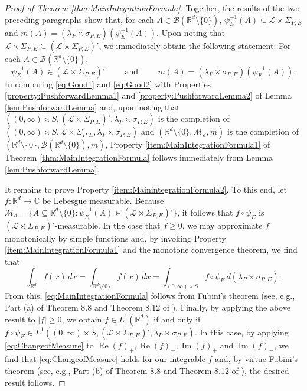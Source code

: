 \documentclass[11pt]{article}
\theoremstyle{remark}
\renewcommand\Re{\operatorname{Re}}%
\renewcommand\Im{\operatorname{Im}}
\begin{document}
\begin{proof}[Proof of Theorem \ref{thm:MainIntegrationFormula}]
Together, the results of the two preceding paragraphs show that, for each $A\in\mathcal{B}(\mathbb{R}^d\setminus\{0\})$, $\psi_E^{-1}(A)\subseteq \mathcal{L}\times\Sigma_{P,E}$ and $m(A)=(\lambda_P\times\sigma_{P,E})(\psi_E^{-1}(A))$. Upon noting that $\mathcal{L}\times\Sigma_{P,E}\subseteq (\mathcal{L}\times\Sigma_{P,E})'$, we immediately obtain the following statement: For each $A\in\mathcal{B}(\mathbb{R}^d\setminus\{0\})$,
\begin{equation}\label{eq:Good2}
\psi_E^{-1}(A)\in (\mathcal{L}\times\Sigma_{P,E})'\hspace{1cm}\mbox{and}\hspace{1cm}m(A)=(\lambda_P\times\sigma_{P,E})(\psi_E^{-1}(A)).
\end{equation}
In comparing \eqref{eq:Good1} and \eqref{eq:Good2} with Properties \ref{property:PushforwardLemma1} and \ref{property:PushforwardLemma2} of Lemma \ref{lem:PushforwardLemma} and, upon noting that $((0,\infty)\times S,(\mathcal{L}\times\Sigma_{P,E})',\lambda_P\times\sigma_{P,E})$ is the completion of $((0,\infty)\times S,\mathcal{L}\times\Sigma_{P,E},\lambda_P\times\sigma_{P,E})$ and $(\mathbb{R}^d\setminus\{0\},\mathcal{M}_d,m)$ is the completion of $(\mathbb{R}^d\setminus\{0\},\mathcal{B}(\mathbb{R}^d\setminus\{0\}),m)$, Property \ref{item:MainIntegrationFormula1} of Theorem \ref{thm:MainIntegrationFormula} follows immediately from Lemma \ref{lem:PushforwardLemma}.

It remains to prove Property \ref{item:MainintegrationFormula2}. To this end, let $f:\mathbb{R}^d\to\mathbb{C}$ be Lebesgue measurable. Because $\mathcal{M}_d=\{A\subseteq \mathbb{R}^d\setminus\{0\}:\psi_E^{-1}(A)\in(\mathcal{L}\times\Sigma_{P,E})'\}$, it follows that $f\circ\psi_E$ is $(\mathcal{L}\times\Sigma_{P,E})'$-measurable. In the case that $f\geq 0$, we may approximate $f$ monotonically by simple functions and, by invoking Property \ref{item:MainIntegrationFormula1} and the monotone convergence theorem, we find that
\begin{equation}\label{eq:ChangeofMeasure}
\int_{\mathbb{R}^d}f(x)\,dx=\int_{\mathbb{R}^d\setminus \{0\}}f(x)\,dx=\int_{(0,\infty)\times S}f\circ \psi_E\, d(\lambda_P\times\sigma_{P,E}).
\end{equation}
From this, \eqref{eq:MainIntegrationFormula} follows from Fubini's theorem (see, e.g., Part (a) of Theorem 8.8 and Theorem 8.12 of \cite{rudin_real_1987}). Finally, by applying the above result to $|f|\geq 0$, we obtain $f\in L^1(\mathbb{R}^d)$ if and only if $f\circ \psi_E\in L^1((0,\infty)\times S,(\mathcal{L}\times\Sigma_{P,E})',\lambda_P\times\sigma_{P,E})$. In this case, by applying \eqref{eq:ChangeofMeasure} to $\Re(f)_+,\Re(f)_-,\Im(f)_+$ and $\Im(f)_-$, we find that \eqref{eq:ChangeofMeasure} holds for our integrable $f$ and, by virtue Fubini's theorem (see, e.g., Part (b) of Theorem 8.8 and Theorem 8.12 of \cite{rudin_real_1987}), the desired result follows.
\end{proof}
\end{document}
